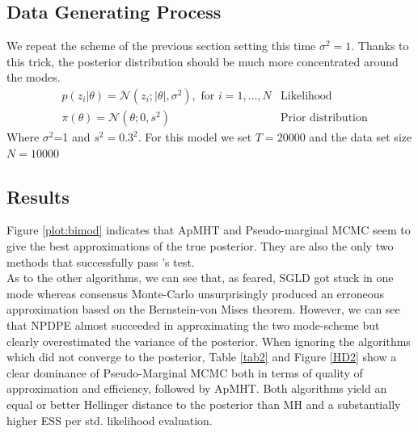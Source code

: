 \documentclass[11pt,a4paper]{report}\usepackage[]{graphicx}\usepackage[]{color}
\begin{document}
\subsection{Data Generating Process}

We repeat the scheme of the previous section setting this time $\sigma^2=1$. Thanks to this trick, the posterior distribution should be much more concentrated around the modes.
\begin{align}
\label{eq:5}
&p(z_i|\theta)=\mathcal N(z_i;|\theta|,\sigma^2),\text{ for $i=1,...,N$}&\text{Likelihood}\\
\label{eq:6}
&\pi(\theta)=\mathcal N(\theta;0,s^2)&\text{Prior distribution}
\end{align}
Where $\sigma^2$=1 and $s^2=0.3^2$.
For this model we set $T=20000$ and the data set size $N=10000$
\subsection{Results}
Figure \ref{plot:bimod} indicates that ApMHT and Pseudo-marginal MCMC seem to give the best approximations of the true posterior. They are also the only two methods that successfully pass \cite{geweke2004getting}'s test.\\
As to the other algorithms, we can see that, as feared, SGLD got stuck in one mode whereas consensus Monte-Carlo unsurprisingly produced an erroneous approximation based on the Bernstein-von Mises theorem. However, we can see that NPDPE almost succeeded in approximating the two mode-scheme but clearly overestimated the variance of the posterior.
When ignoring the algorithms which did not converge to the posterior, Table \ref{tab2} and Figure \ref{HD2} show a clear dominance of Pseudo-Marginal MCMC both in terms of quality of approximation and efficiency, followed by ApMHT. Both algorithms yield an equal or better Hellinger distance to the posterior than MH and a substantially higher ESS per std. likelihood evaluation.
\end{document}
